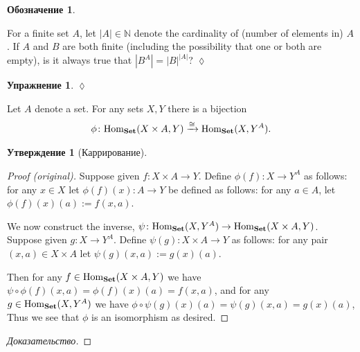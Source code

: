 \documentclass[a4paper]{book}
\def\tn{\textnormal}
\def\NN{{\mathbb N}}
\def\Hom{\tn{Hom}}
\def\to{\rightarrow}
\def\taking{\colon}
\def\iso{\cong}
\newcommand{\To}[1]{\xrightarrow{#1}}
\def\Set{{\bf Set}}
\theoremstyle{myth}
\newtheorem{propositionENG}[envENG]{\begin{english}Proposition\end{english}}
\newtheorem{excENG}[envENG]{\begin{english}Exercise\end{english}}
\newenvironment{proofENG}{\begin{proof}[Proof (original)]}{\end{proof}}
\newenvironment{exerciseENG}{\begin{excENG}}{\hspace*{\fill}$\lozenge$\end{excENG}}
\newtheorem{propositionRUS}[envRUS]{Утверждение}
\newtheorem{excRUS}[envRUS]{Упражнение}
\newtheorem{notationRUS}[envRUS]{Обозначение}
\newenvironment{proofRUS}{\begin{proof}[Доказательство]}{\end{proof}}
\newenvironment{exerciseRUS}{\begin{excRUS}}{\hspace*{\fill}$\lozenge$\end{excRUS}}
\begin{document}
\begin{russian}
\begin{notationRUS}\index{exponentials ! in $\Set$}
 
\end{notationRUS}

\begin{exerciseENG}
For a finite set $A$, let $|A|\in\NN$ denote the cardinality of (number of elements in) $A$. If $A$ and $B$ are both finite (including the possibility that one or both are empty), is it always true that $|B^A|=|B|^{|A|}$?
\end{exerciseENG}

\begin{exerciseRUS}
 
\end{exerciseRUS}

\begin{propositionENG}[Currying]\label{prop:curry}
Let $A$ denote a set. For any sets $X,Y$ there is a bijection 
\begin{align}\label{dia:curry bijection}
\phi\taking\Hom_\Set(X\times A,Y)\To{\iso}\Hom_\Set(X,Y^A).
\end{align}
\end{propositionENG}

\begin{propositionRUS}[Каррирование]\label{prop:curry}
 
\end{propositionRUS}

\begin{proofENG}
Suppose given $f\taking X\times A\to Y$. Define $\phi(f)\taking X\to Y^A$ as follows: for any $x\in X$ let $\phi(f)(x)\taking A\to Y$ be defined as follows: for any $a\in A$, let $\phi(f)(x)(a):=f(x,a)$. 

We now construct the inverse, $\psi\taking\Hom_\Set(X,Y^A)\to\Hom_\Set(X\times A,Y)$. Suppose given $g\taking X\to Y^A$. Define $\psi(g)\taking X\times A\to Y$ as follows: for any pair $(x,a)\in X\times A$ let $\psi(g)(x,a):=g(x)(a)$. 

Then for any $f\in\Hom_\Set(X\times A,Y)$ we have $\psi\circ\phi(f)(x,a)=\phi(f)(x)(a)=f(x,a)$, and for any $g\in\Hom_\Set(X,Y^A)$ we have $\phi\circ\psi(g)(x)(a)=\psi(g)(x,a)=g(x)(a)$, Thus we see that $\phi$ is an isomorphism as desired.
\end{proofENG}

\begin{proofRUS}
 
\end{proofRUS}


\end{russian}
\end{document}
